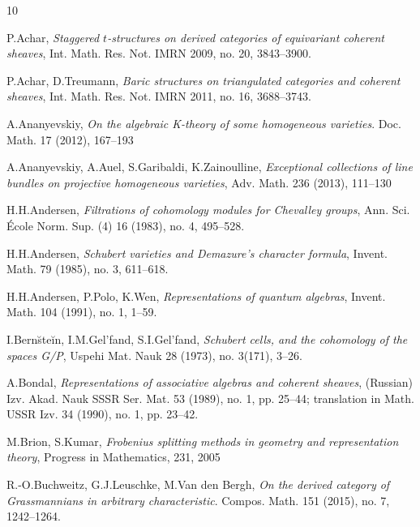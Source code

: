 \documentclass[sn-mathphys-num]{sn-jnl}%
\theoremstyle{definition}
\begin{document}
\begin{thebibliography}{10}

P.Achar, {\it Staggered $t$-structures on derived categories of equivariant coherent sheaves}, Int. Math. Res. Not. IMRN 2009, no. 20, 3843--3900.

P.Achar, D.Treumann, {\it Baric structures on triangulated categories and coherent sheaves}, Int. Math. Res. Not. IMRN 2011, no. 16, 3688--3743.

A.Ananyevskiy, {\it On the algebraic K-theory of some homogeneous varieties}. Doc. Math. 17 (2012),  167--193

A.Ananyevskiy, A.Auel, S.Garibaldi, K.Zainoulline, {\it 
Exceptional collections of line bundles on projective homogeneous varieties}, Adv. Math. 236 (2013), 111--130

H.H.Andersen, {\it Filtrations of cohomology modules for Chevalley groups}, Ann. Sci. \'Ecole Norm. Sup. (4) 16 (1983), no. 4, 495--528. 

H.H.Andersen, {\it Schubert varieties and Demazure's character formula}, 
Invent. Math. 79 (1985), no. 3, 611--618.

H.H.Andersen, P.Polo, K.Wen, {\it Representations of quantum algebras}, Invent. Math. 104 (1991), no. 1, 1--59.


I.Bern\u{s}te\u{i}n, I.M.Gel'fand, S.I.Gel'fand, {\it Schubert cells, and the cohomology of the spaces G/P}, Uspehi Mat. Nauk 28 (1973), no. 3(171), 3--26. 

A.Bondal, {\it Representations of associative algebras and coherent
sheaves}, (Russian) Izv. Akad. Nauk SSSR Ser. Mat. 53 (1989), no. 1,
pp. 25--44; translation in Math. USSR Izv. 34 (1990), no. 1,
pp. 23--42.

M.Brion, S.Kumar, {\it Frobenius splitting methods in geometry and representation theory}, Progress in Mathematics, 231, 2005

R.-O.Buchweitz, G.J.Leuschke, M.Van den Bergh, {\it On the derived category of Grassmannians in arbitrary characteristic}. Compos. Math. 151 (2015), no. 7, 1242--1264.


\end{thebibliography}
\end{document}

